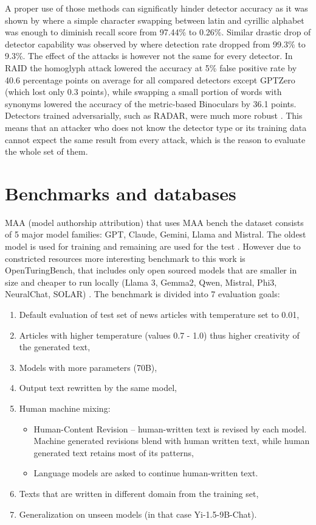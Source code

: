\documentclass[W2, polski]{ThesisPLodz}
\let\cite\citep
\begin{document}
    A proper use of those methods can significatly hinder detector accuracy as it was shown by \cite{wolff2020} where a simple character swapping between latin and cyrillic alphabet was enough to diminish recall score from 97.44\% to 0.26\%. Similar drastic drop of detector capability was observed by \cite{sadasivan2023} where detection rate dropped from 99.3\% to 9.3\%. The effect of the attacks is however not the same for every detector. In RAID the homoglyph attack lowered the accuracy at 5\% false positive rate by 40.6 percentage points on average for all compared detectors except GPTZero (which lost only 0.3 points), while swapping a small portion of words with synonyms lowered the accuracy of the metric-based Binoculars by 36.1 points. Detectors trained adversarially, such as RADAR, were much more robust \cite{dugan2024}. This means that an attacker who does not know the detector type or its training data cannot expect the same result from every attack, which is the reason to evaluate the whole set of them.

    \section{Benchmarks and databases} 
        MAA (model authorship attribution) that uses MAA bench the dataset consists of 5 major model families: GPT, Claude, Gemini, Llama and Mistral. The oldest model is used for training and remaining are used for the test \cite{ko2026}.
        However due to constricted resources more interesting benchmark to this work is OpenTuringBench, that includes only open sourced models that are smaller in size and cheaper to run locally (Llama 3, Gemma2, Qwen, Mistral, Phi3, NeuralChat, SOLAR) \cite{LaCavaOpenTuring}. The benchmark is divided into 7 evaluation goals:
        \begin{enumerate}[label=E\arabic*, start=0]
            \item Default evaluation of test set of news articles with temperature set to 0.01,
            \item Articles with higher temperature (values 0.7 - 1.0) thus higher creativity of the generated text,
            \item Models with more parameters (70B),
            \item Output text rewritten by the same model,
            \item Human machine mixing:
            \begin{itemize}
                \item Human-Content Revision -- human-written text is revised by each model. Machine generated revisions blend with human written text, while human generated text retains most of its patterns,
                \item Language models are asked to continue human-written text.
            \end{itemize} \cite{LaCavaOpenTuring}
            \item Texts that are written in different domain from the training set,
            \item Generalization on unseen models (in that case Yi-1.5-9B-Chat).
        \end{enumerate}
\end{document}
